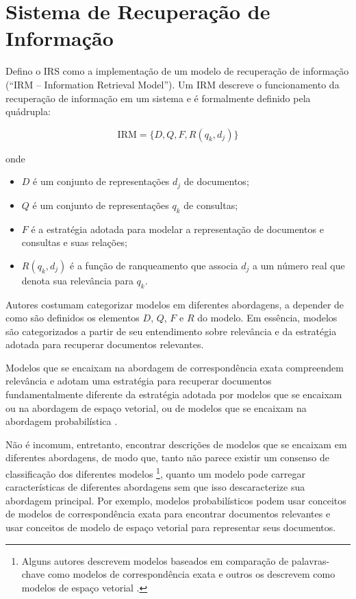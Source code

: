 \documentclass[
	12pt,				%
	openright,			%
	oneside,			%
	a4paper,			%
	english,			%
	french,				%
	spanish,			%
	brazil				%
	]{abntex2}
\begin{document}
\section{Sistema de Recuperação de Informação}\label{sec:sobre-recuperacao-de-informacao}

Defino o IRS como a implementação de um modelo de recuperação de informação (``IRM -- Information Retrieval Model'').
Um IRM descreve o funcionamento da recuperação de informação em um sistema e é formalmente definido pela quádrupla: \cite{Ceri2013}

\begin{equation}
\text{IRM} = \{D, Q, F, R(q_k, d_j)\}
\label{eq:irm}
\end{equation}

onde
\begin{itemize}
    \item \(D\) é um conjunto de representações \(d_j\) de documentos;
    \item \(Q\) é um conjunto de representações \(q_k\) de consultas;
    \item \(F\) é a estratégia adotada para modelar a representação de documentos e consultas e suas relações;
    \item \(R(q_k, d_j)\) é a função de ranqueamento que associa \(d_j\) a um número real que denota sua relevância para \(q_k\).
\end{itemize}

Autores costumam categorizar modelos em diferentes abordagens, a depender de como são definidos os elementos $D$, $Q$, $F$ e $R$ do modelo.
Em essência, modelos são categorizados a partir de seu entendimento sobre relevância e da estratégia adotada para recuperar documentos relevantes.

Modelos que se encaixam na abordagem de correspondência exata compreendem relevância e adotam uma estratégia para recuperar documentos fundamentalmente diferente da estratégia adotada por modelos que se encaixam ou na abordagem de espaço vetorial, ou de modelos que se encaixam na abordagem probabilística
\cite{Hiemstra2009}.

Não é incomum, entretanto, encontrar descrições de modelos que se encaixam em diferentes abordagens,
de modo que, tanto não parece existir um consenso de classificação dos diferentes modelos
\footnote{Alguns autores descrevem modelos baseados em comparação de palavras-chave como modelos de correspondência exata \cite{} e outros os descrevem como modelos de espaço vetorial \cite{Hiemstra2009}.}, quanto
um modelo pode carregar características de diferentes abordagens sem que isso descaracterize sua abordagem principal.
Por exemplo, modelos probabilísticos podem usar conceitos de modelos de correspondência exata para encontrar documentos relevantes e usar conceitos de modelo de espaço vetorial para representar seus documentos.
\end{document}
